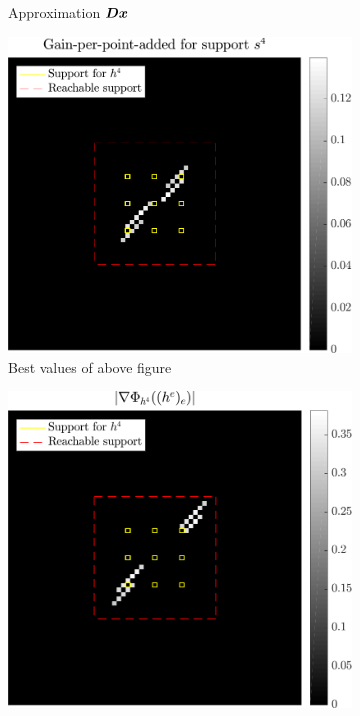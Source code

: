 \begin{figure}[!h]
\begin{subfigure}[b]{0.30\linewidth}
	\caption{Approximation $\bm{D}\bm{x}$}\label{fig_gain_n4-approx}
	\end{subfigure}
	\begin{subfigure}[b]{0.34\linewidth}\centering
	\includegraphics[width=\linewidth]{figures/xp/n4/xp_128x128_sc2_angl1_K3_S3_node4_objmatrix_bestvalues.pdf}
	\caption{Best values of above figure}\label{fig_gain_n4-gain_best}
	\end{subfigure}
	\begin{subfigure}[b]{0.34\linewidth}\centering
	\includegraphics[width=\linewidth]{figures/xp/n4/xp_128x128_sc2_angl1_K3_S3_node4_partgrad4_bestvalues.pdf}

\end{subfigure}
\end{figure}
